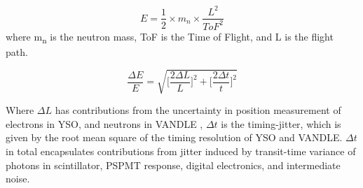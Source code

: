 \begin{equation}
E=\frac{1}{2} \times m_{n} \times  \frac{ L^2}{ ToF^{2}}
\end{equation}
where m\textsubscript{n} is the neutron mass, ToF is the Time of Flight, and L is the flight path. 

\begin{equation}
\frac{\Delta E}{E}  = \sqrt{\Bigg[\frac{2\Delta L}{L}\Bigg]^2 + \Bigg[\frac{2\Delta t}{t}\Bigg]^2}
\end{equation}

Where $\Delta L$ has contributions from the uncertainty in position measurement of electrons in YSO, and neutrons in VANDLE \citep{VANDLE}, $\Delta t$ is the timing-jitter, which is given by the root mean square of the timing resolution of YSO and VANDLE. $\Delta t$ in total encapsulates contributions from jitter induced by transit-time variance of photons in scintillator,  PSPMT response, digital electronics, and intermediate noise. 

